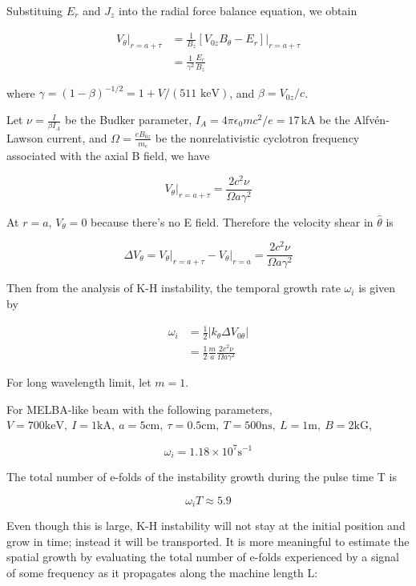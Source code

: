 \documentclass[
  notoc %
]{tufte-book}
\begin{document}
Substituing \(E_r\) and \(J_z\) into the radial force balance equation,
we obtain

\[
\begin{aligned}
V_{\theta}\big|_{r=a+\tau} &= \frac{1}{B_{z}}[V_{0z}B_\theta - E_r]\big|_{r=a+\tau}\\
&=\frac{1}{\gamma^2}\frac{E_r}{B_z}
\end{aligned}
\]

where \(\gamma=(1-\beta)^{-1/2}=1+V/(511\text{ keV})\), and
\(\beta= V_{0z}/c\).

Let \(\nu=\frac{I}{\beta I_A}\) be the Budker parameter,
\(I_A=4\pi\epsilon_0 mc^2/e=17\,\text{kA}\) be the Alfvén-Lawson
current, and \(\Omega=\frac{eB_{0z}}{m_e}\) be the nonrelativistic
cyclotron frequency associated with the axial B field, we have

\[
V_\theta\big|_{r=a+\tau} = \frac{2c^2\nu}{\Omega a\gamma^2}
\]

At \(r=a\), \(V_\theta=0\) because there's no E field. Therefore the
velocity shear in \(\hat{\theta}\) is

\[
\Delta V_{\theta} = V_\theta\big|_{r=a+\tau} - V_\theta\big|_{r=a} =\frac{2c^2\nu}{\Omega a \gamma^2}
\]

Then from the analysis of K-H instability, the temporal growth rate
\(\omega_i\) is given by

\[
\begin{aligned}
\omega_i &= \frac{1}{2}|k_\theta \Delta V_{0\theta}| \\
&=\frac{1}{2}\frac{m}{a}\frac{2c^2\nu}{\Omega a \gamma^2}
\end{aligned}
\]

For long wavelength limit, let \(m=1\).

For MELBA-like beam with the following parameters,
\(V=700\text{keV},\ I=1\text{kA},\ a = 5\text{cm},\ \tau=0.5\text{cm},\ T=500\text{ns},\ L=1\text{m},\ B=2\text{kG}\),

\[
\omega_i =1.18\times 10^7 \text{s}^{-1}
\]

The total number of e-folds of the instability growth during the pulse
time T is

\[
\omega_i T \approx 5.9
\]

Even though this is large, K-H instability will not stay at the initial
position and grow in time; instead it will be transported. It is more
meaningful to estimate the spatial growth by evaluating the total number
of e-folds experienced by a signal of some frequency as it propagates
along the machine length L:
\end{document}
